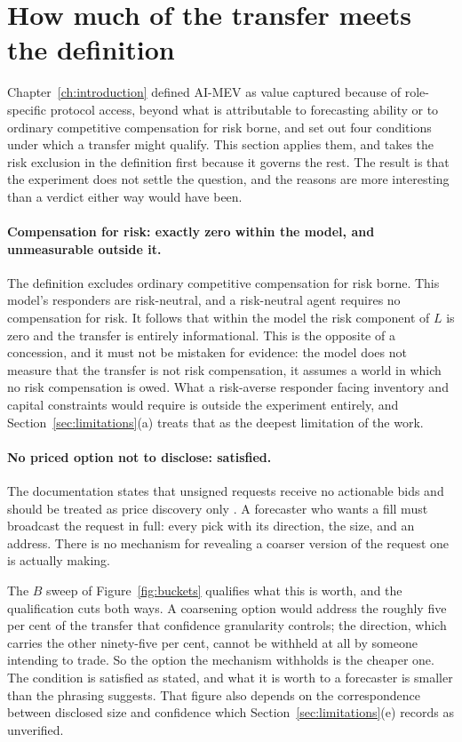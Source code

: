 \section{How much of the transfer meets the definition}
\label{sec:howmuch}

Chapter~\ref{ch:introduction} defined AI-MEV as value captured because of role-specific
protocol access, beyond what is attributable to forecasting ability or to ordinary
competitive compensation for risk borne, and set out four conditions under which a transfer
might qualify. This section applies them, and takes the risk exclusion in the definition
first because it governs the rest. The result is that the experiment does not settle the question, and the reasons are
more interesting than a verdict either way would have been.

\paragraph{Compensation for risk: exactly zero within the model, and unmeasurable outside
it.} The definition excludes ordinary competitive compensation for risk borne. This model's
responders are risk-neutral, and a risk-neutral agent requires no compensation for risk. It
follows that within the model the risk component of $L$ is zero and the transfer is entirely
informational. This is the opposite of a concession, and it must not be mistaken for
evidence: the model does not measure that the transfer is not risk compensation, it assumes
a world in which no risk compensation is owed. What a risk-averse responder facing inventory
and capital constraints would require is outside the experiment entirely, and
Section~\ref{sec:limitations}(a) treats that as the deepest limitation of the work.

\paragraph{No priced option not to disclose: satisfied.} The documentation states that
unsigned requests receive no actionable bids and should be treated as price discovery only
\cite{sapience2026builderguide}. A forecaster who wants a fill must broadcast the request in
full: every pick with its direction, the size, and an address. There is no mechanism for
revealing a coarser version of the request one is actually making.

The $B$ sweep of Figure~\ref{fig:buckets} qualifies what this is worth, and the
qualification cuts both ways. A coarsening option would address the roughly five per cent of
the transfer that confidence granularity controls; the direction, which carries the other
ninety-five per cent, cannot be withheld at all by someone intending to trade. So the option the
mechanism withholds is the cheaper one. The condition is satisfied as stated, and
what it is worth to a forecaster is smaller than the phrasing suggests. That figure also
depends on the correspondence between disclosed size and confidence which
Section~\ref{sec:limitations}(e) records as unverified.

